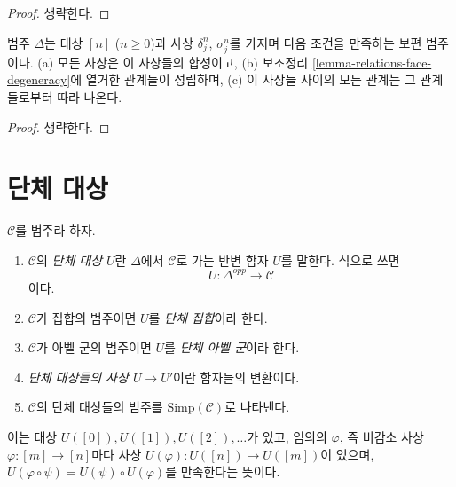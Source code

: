\begin{proof}
생략한다.
\end{proof}

\begin{lemma}
\label{lemma-face-degeneracy-category}
범주 $\Delta$는 대상 $[n]$ ($n \geq 0$)과 사상
$\delta^n_j$, $\sigma^n_j$를 가지며 다음 조건을 만족하는 보편 범주이다.
(a) 모든 사상은 이 사상들의 합성이고, (b) 보조정리
\ref{lemma-relations-face-degeneracy}에 열거한 관계들이 성립하며,
(c) 이 사상들 사이의 모든 관계는 그 관계들로부터 따라 나온다.
\end{lemma}

\begin{proof}
생략한다.
\end{proof}















\section{단체 대상}
\label{section-simplicial-object}

\begin{definition}
\label{definition-simplicial-object}
$\mathcal{C}$를 범주라 하자.
\begin{enumerate}
\item $\mathcal{C}$의 {\it 단체 대상 $U$}란 $\Delta$에서
$\mathcal{C}$로 가는 반변 함자 $U$를 말한다. 식으로 쓰면
$$
U : \Delta^{opp} \longrightarrow \mathcal{C}
$$
이다.
\item $\mathcal{C}$가 집합의 범주이면 $U$를 {\it 단체 집합}이라 한다.
\item $\mathcal{C}$가 아벨 군의 범주이면 $U$를
{\it 단체 아벨 군}이라 한다.
\item {\it 단체 대상들의 사상 $U \to U'$}이란 함자들의 변환이다.
\item {$\mathcal{C}$의 단체 대상들의 범주}를
$\text{Simp}(\mathcal{C})$로 나타낸다.
\end{enumerate}
\end{definition}

\noindent
이는 대상 $U([0]), U([1]), U([2]), \ldots$가 있고, 임의의 $\varphi$, 즉
비감소 사상 $\varphi : [m] \to [n]$마다 사상
$U(\varphi) : U([n]) \to U([m])$이 있으며,
$U(\varphi \circ \psi) = U(\psi) \circ U(\varphi)$를 만족한다는 뜻이다.

